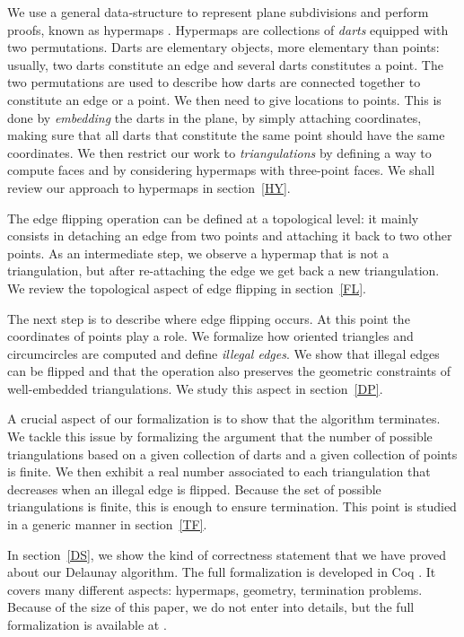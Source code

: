 \documentclass{llncs}
\begin{document}
We use a general data-structure to represent plane subdivisions and
perform proofs, known as hypermaps
 \cite{tut2,cor,duf09b,ber:duf,duf:pui,duf08a,duf09}.
Hypermaps are collections of {\em darts} equipped with two permutations.
Darts are elementary objects, more elementary than points: usually,
two darts constitute an edge and several darts constitutes a point.
The two permutations are used to describe how darts are connected
together to constitute an edge or a point.
We then need to give locations to points.  This is done by {\em
  embedding} the darts in the plane, by simply attaching coordinates,
making sure that all darts that constitute the
same point should have the same coordinates.  We then restrict our
work to {\em triangulations} by defining a way to compute faces
and by considering hypermaps with three-point faces.
  We shall review our approach to hypermaps
in section~\ref{HY}.

The edge flipping operation can be defined at a topological level: it
mainly consists in detaching an edge from two points and attaching it
back to two other points.  As an intermediate step, we observe a
hypermap that is not a triangulation, but after re-attaching the edge
we get back a new triangulation.  We review the topological aspect of
edge flipping in section~\ref{FL}.

The next step is to describe where edge flipping occurs.  At this point
the coordinates of points play a role.  We formalize how oriented
triangles and circumcircles are computed and define {\em illegal edges}.
We show that illegal edges can be flipped and that the operation also
preserves the geometric constraints of well-embedded triangulations.  We
study this aspect in section~\ref{DP}.

A crucial aspect of our formalization is to show that the algorithm
terminates.  We tackle this issue by formalizing the argument that the
number of possible triangulations based on a given collection of darts
and a given collection of points is finite.  We then exhibit a real
number associated to each triangulation that decreases when an illegal
edge is flipped.  Because the
set of possible triangulations is finite, this is enough to ensure
termination.  This point is studied in a generic manner in section~\ref{TF}.

In section~\ref{DS}, we show the kind of correctness statement that we have
proved about our Delaunay algorithm.  The full formalization is
developed in Coq \cite{ber:cas,Coq}.  It covers many different
aspects: hypermaps, geometry, termination problems.  Because of the
 size of this
paper, we do not enter into details, but the full
formalization is available at \cite{duf:ber10}.
\end{document}
